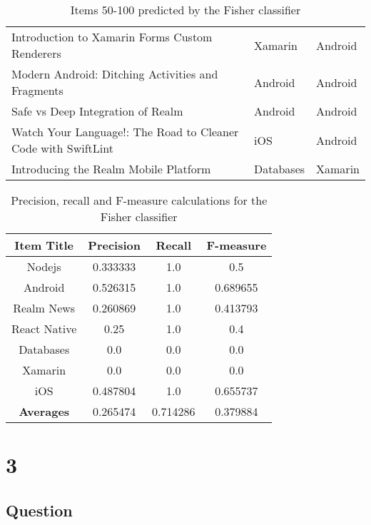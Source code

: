 \documentclass[letterpaper,11pt]{article}
\begin{document}
\begin{table}[h]
\begin{adjustbox}{max width=\linewidth}
\begin{tabular}{ | l | l | l |}
Introduction to Xamarin Forms Custom Renderers & Xamarin & Android \\
Modern Android: Ditching Activities and Fragments & Android & Android \\
Safe vs Deep Integration of Realm & Android & Android \\
Watch Your Language!: The Road to Cleaner Code with SwiftLint & iOS & Android \\
Introducing the Realm Mobile Platform & Databases & Xamarin \\
\hline
\end{tabular}
\end{adjustbox}
\caption{Items 50-100 predicted by the Fisher classifier}
\label{table:q2classified}
\end{table}

\begin{table}[h]
\centering
\begin{adjustbox}{max width=\linewidth}
\begin{tabular}{ | c | c | c | c |}
\hline
\textbf{Item Title} & \textbf{Precision} & \textbf{Recall} & \textbf{F-measure} \\
\hline
Nodejs & 0.333333 & 1.0 & 0.5 \\
Android & 0.526315 & 1.0 & 0.689655 \\
Realm News & 0.260869 & 1.0 & 0.413793 \\
React Native & 0.25 & 1.0 & 0.4 \\
Databases & 0.0 & 0.0 & 0.0 \\
Xamarin & 0.0 & 0.0 & 0.0 \\
iOS & 0.487804 & 1.0 & 0.655737 \\
\hline
\textbf{Averages} & 0.265474 & 0.714286 & 0.379884 \\
\hline
\end{tabular}
\end{adjustbox}
\caption{Precision, recall and F-measure calculations for the Fisher classifier}
\label{table:q2calcs}
\end{table}


\clearpage


\section*{3}

\subsection*{Question}
\end{document}
